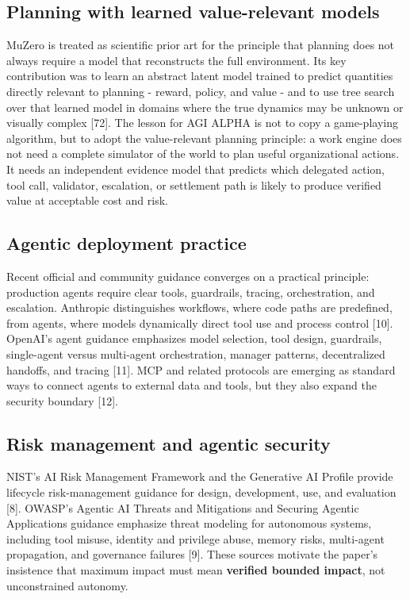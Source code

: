 \documentclass[11pt]{article}
\begin{document}
\subsection{Planning with learned value-relevant models}\label{planning-with-learned-value-relevant-models}

MuZero is treated as scientific prior art for the principle that planning does not always require a model that reconstructs the full environment. Its key contribution was to learn an abstract latent model trained to predict quantities directly relevant to planning - reward, policy, and value - and to use tree search over that learned model in domains where the true dynamics may be unknown or visually complex {[}72{]}. The lesson for AGI ALPHA is not to copy a game-playing algorithm, but to adopt the value-relevant planning principle: a work engine does not need a complete simulator of the world to plan useful organizational actions. It needs an independent evidence model that predicts which delegated action, tool call, validator, escalation, or settlement path is likely to produce verified value at acceptable cost and risk.

\subsection{Agentic deployment practice}\label{agentic-deployment-practice}

Recent official and community guidance converges on a practical principle: production agents require clear tools, guardrails, tracing, orchestration, and escalation. Anthropic distinguishes workflows, where code paths are predefined, from agents, where models dynamically direct tool use and process control {[}10{]}. OpenAI's agent guidance emphasizes model selection, tool design, guardrails, single-agent versus multi-agent orchestration, manager patterns, decentralized handoffs, and tracing {[}11{]}. MCP and related protocols are emerging as standard ways to connect agents to external data and tools, but they also expand the security boundary {[}12{]}.

\subsection{Risk management and agentic security}\label{risk-management-and-agentic-security}

NIST's AI Risk Management Framework and the Generative AI Profile provide lifecycle risk-management guidance for design, development, use, and evaluation {[}8{]}. OWASP's Agentic AI Threats and Mitigations and Securing Agentic Applications guidance emphasize threat modeling for autonomous systems, including tool misuse, identity and privilege abuse, memory risks, multi-agent propagation, and governance failures {[}9{]}. These sources motivate the paper's insistence that maximum impact must mean \textbf{verified bounded impact}, not unconstrained autonomy.
\end{document}

